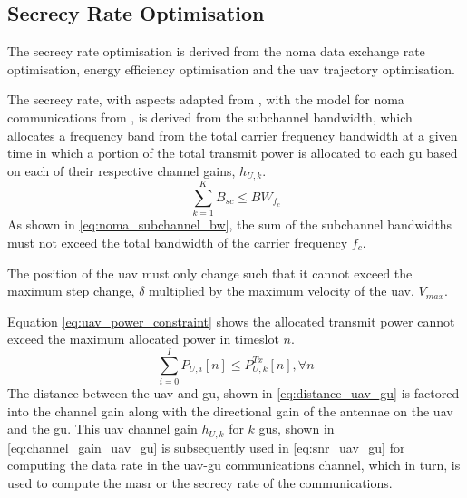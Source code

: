 \subsection{Secrecy Rate Optimisation}
The secrecy rate optimisation is derived from the \acrshort{noma} data exchange rate optimisation, energy efficiency optimisation and the \acrshort{uav} trajectory optimisation. 

The secrecy rate, with aspects adapted from \cite{zhang_one_2025}, with the model for \acrshort{noma} communications from \cite{silvirianti_layerwise_2024}, is derived from the subchannel bandwidth, which allocates a frequency band from the total carrier frequency bandwidth at a given time in which a portion of the total transmit power is allocated to each \acrshort{gu} based on each of their respective channel gains, $h_{U, k}$.
\begin{equation} \label{eq:noma_subchannel_bw}
   \sum_{k=1}^{K} B_{sc} \le BW_{f_{c}}
\end{equation}
As shown in \ref{eq:noma_subchannel_bw}, the sum of the subchannel bandwidths must not exceed the total bandwidth of the carrier frequency $f_{c}$. 

The position of the \acrshort{uav} must only change such that it cannot exceed the maximum step change, $\delta$ multiplied by the maximum velocity of the \acrshort{uav}, $V_{max}$. 

Equation \ref{eq:uav_power_constraint} shows the allocated transmit power cannot exceed the maximum allocated power in timeslot $n$. 
\begin{equation} \label{eq:uav_power_constraint}
    \sum_{i=0}^{I} P_{U, i} [n] \le P_{U, k}^{Tx} [n], \forall n
\end{equation}
The distance between the \acrshort{uav} and \acrshort{gu}, shown in \ref{eq:distance_uav_gu} is factored into the channel gain along with the directional gain of the antennae on the \acrshort{uav} and the \acrshort{gu}. 
This \acrshort{uav} channel gain $h_{U, k}$ for $k$ \acrshort{gu}s, shown in \ref{eq:channel_gain_uav_gu} is subsequently used in \ref{eq:snr_uav_gu} for computing the data rate in the \acrshort{uav}-\acrshort{gu} communications channel, which in turn, is used to compute the \acrshort{masr} or the secrecy rate of the communications. 

